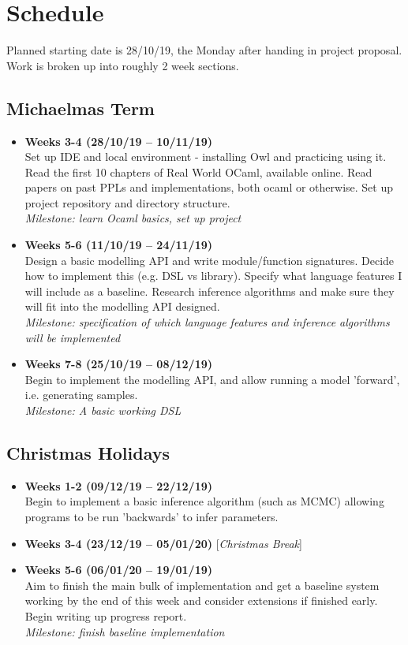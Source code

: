\section*{Schedule}
Planned starting date is {28/10/19}, the Monday after handing in project proposal. Work is broken up into roughly 2 week sections.

\subsection*{Michaelmas Term}
\begin{itemize}
      \item {\bf Weeks 3-4 (28/10/19 -- 10/11/19)} \\ Set up IDE and local environment - installing Owl and practicing using it. Read the first 10 chapters of Real World OCaml, available online. Read papers on past PPLs and implementations, both ocaml or otherwise. Set up project repository and directory structure.
      \\ \textit{Milestone: learn Ocaml basics, set up project}
      \item \textbf{Weeks 5-6 (11/10/19 -- 24/11/19)}\\ Design a basic modelling API and write module/function signatures. Decide how to implement this (e.g. DSL vs library). Specify what language features I will include as a baseline. Research inference algorithms and make sure they will fit into the modelling API designed.
      \\ \textit{Milestone: specification of which language features and inference algorithms will be implemented}
      \item \textbf{Weeks 7-8 (25/10/19 -- 08/12/19)}\\ Begin to implement the modelling API, and allow running a model 'forward', i.e. generating samples.
      \\ \textit{Milestone: A basic working DSL}
\end{itemize}
\subsection*{Christmas Holidays}
\begin{itemize}
      \item \textbf{Weeks 1-2 (09/12/19 -- 22/12/19)}\\ Begin to implement a basic inference algorithm (such as MCMC) allowing programs to be run 'backwards' to infer parameters.
      \item \textbf{Weeks 3-4 (23/12/19 -- 05/01/20)} [\textit{Christmas Break}]
      \item \textbf{Weeks 5-6 (06/01/20 -- 19/01/19)}\\ Aim to finish the main bulk of implementation and get a baseline system working by the end of this week and consider extensions if finished early. Begin writing up progress report.
      \\ \textit{Milestone: finish baseline implementation}
\end{itemize}
